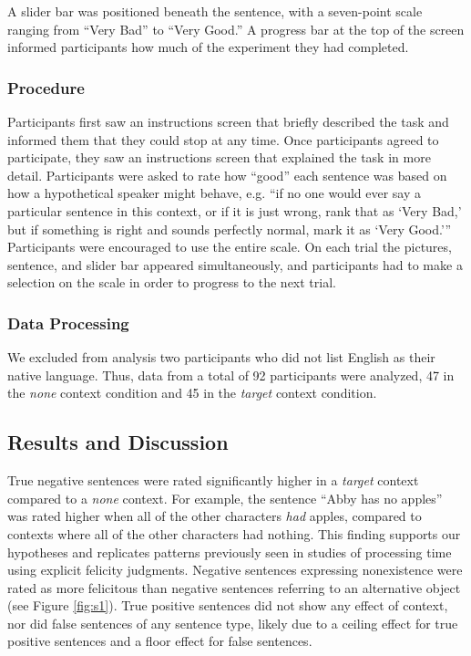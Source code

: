 \documentclass[10pt,letterpaper]{article}
\begin{document}
A slider bar was positioned beneath the sentence, with a seven-point scale ranging from ``Very Bad'' to ``Very Good.''  A progress bar at the top of the screen informed participants how much of the experiment they had completed. 

\vspace{.2cm}

\subsubsection{Procedure}

Participants first saw an instructions screen that briefly described the task and informed them that they could stop at any time.  Once participants agreed to participate, they saw an instructions screen that explained the task in more detail.  Participants were asked to rate how ``good'' each sentence was based on how a hypothetical speaker might behave, e.g. ``if no one would ever say a particular sentence in this context, or if it is just wrong, rank that as `Very Bad,' but if something is right and sounds perfectly normal, mark it as `Very Good.''' Participants were encouraged to use the entire scale. On each trial the pictures, sentence, and slider bar appeared simultaneously, and participants had to make a selection on the scale in order to progress to the next trial.  

\vspace{.2cm}

\subsubsection{Data Processing}

We excluded from analysis two participants who did not list English as their native language.  Thus, data from a total of 92 participants were analyzed, 47 in the \emph{none} context condition and 45 in the \emph{target} context condition.  

\subsection{Results and Discussion}

True negative sentences were rated significantly higher in a \emph{target} context compared to a \emph{none} context. For example, the sentence ``Abby has no apples'' was rated higher when all of the other characters \emph{had} apples, compared to contexts where all of the other characters had nothing. This finding supports our hypotheses and replicates patterns previously seen in studies of processing time using explicit felicity judgments.  Negative sentences expressing nonexistence were rated as more felicitous than negative sentences referring to an alternative object (see Figure \ref{fig:s1}). True positive sentences did not show any effect of context, nor did false sentences of any sentence type, likely due to a ceiling effect for true positive sentences and a floor effect for false sentences.
 
\end{document}

